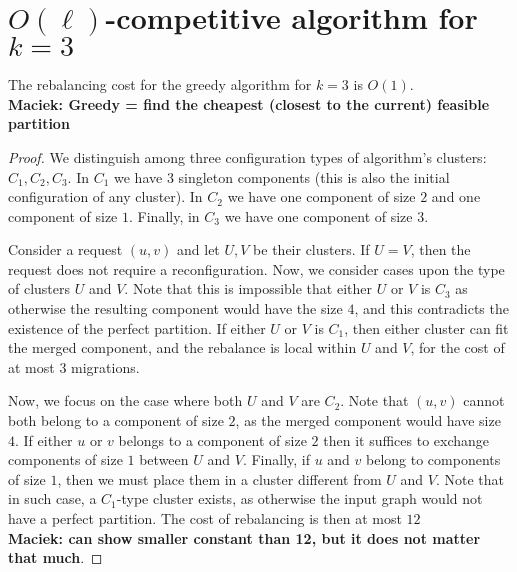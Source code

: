\documentclass[manuscript,screen=true]{acmart}
\newcommand\maciek[1]{\color{brown}\textbf{\\ Maciek: #1}\color{black}}
\begin{document}
\section{$O(\ell)$-competitive algorithm for $k=3$}


\begin{lemma} \label{lemma:k=3}
  The rebalancing cost for the greedy algorithm for $k=3$ is $O(1)$.
  \maciek{Greedy = find the cheapest (closest to the current) feasible partition}
  \label{rebalancing-cost}
\end{lemma}

\begin{proof} 
  
  We distinguish among three configuration types of algorithm's clusters: $C_1, C_2, C_3$. In $C_1$ we have $3$ singleton components (this is also the initial configuration of any cluster). In $C_2$ we have one component of size $2$ and one component of size $1$. Finally, in $C_3$ we have one component of size $3$.

  Consider a request $(u, v)$ and let $U, V$ be their clusters.
  If $U=V$, then the request does not require a reconfiguration.
  Now, we consider cases upon the type of clusters $U$ and $V$.
  Note that this is impossible that either $U$ or $V$ is $C_3$ as otherwise the resulting component would have the size $4$, and this contradicts the existence of the perfect partition.
  If either $U$ or $V$ is $C_1$, then either cluster can fit the merged component, and the rebalance is local within $U$ and $V$, for the cost of at most $3$ migrations.

  Now, we focus on the case where both $U$ and $V$ are $C_2$. Note that $(u,v)$ cannot both belong to a component of size $2$, as the merged component would have size $4$.
  If either $u$ or $v$ belongs to a component of size $2$ then it suffices to exchange components of size $1$ between $U$ and $V$.
  Finally, if $u$ and $v$ belong to components of size $1$, then we must place them in a cluster different from $U$ and $V$.
  Note that in such case, a $C_1$-type cluster exists, as otherwise the input graph would not have a perfect partition. The cost of rebalancing is then at most $12$ \maciek{can show smaller constant than 12, but it does not matter that much}.
\end{proof}
\end{document}
